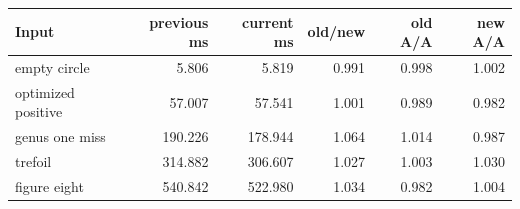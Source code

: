 \begin{center}
\small
\begin{tabular}{lrrrrr}
\toprule
Input & previous ms & current ms & old/new & old A/A & new A/A\\
\midrule
empty circle & 5.806 & 5.819 & 0.991 & 0.998 & 1.002\\
optimized positive & 57.007 & 57.541 & 1.001 & 0.989 & 0.982\\
genus one miss & 190.226 & 178.944 & 1.064 & 1.014 & 0.987\\
trefoil & 314.882 & 306.607 & 1.027 & 1.003 & 1.030\\
figure eight & 540.842 & 522.980 & 1.034 & 0.982 & 1.004\\
\bottomrule
\end{tabular}
\end{center}
